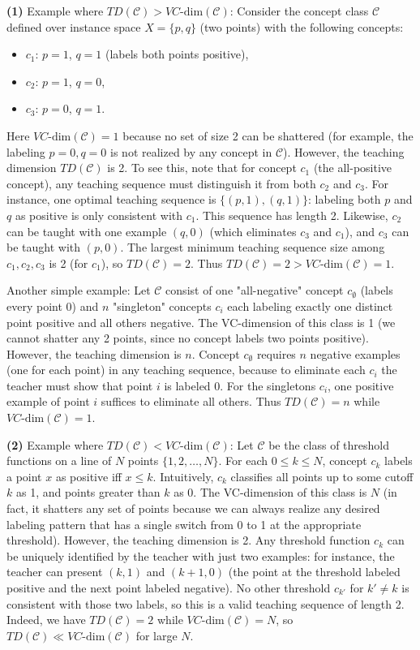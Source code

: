 \documentclass[11pt]{article}
\DeclareMathOperator{\1}{\mathbbm{1}}
\begin{document}
\textbf{(1)} Example where $TD(\mathcal{C}) > VC\text{-dim}(\mathcal{C})$: Consider the concept class $\mathcal{C}$ defined over instance space $X=\{p,q\}$ (two points) with the following concepts:
\begin{itemize}
  \item $c_1$: $p=1$, $q=1$ (labels both points positive),
  \item $c_2$: $p=1$, $q=0$,
  \item $c_3$: $p=0$, $q=1$.
\end{itemize}
Here $VC\text{-dim}(\mathcal{C}) = 1$ because no set of size 2 can be shattered (for example, the labeling $p=0,q=0$ is not realized by any concept in $\mathcal{C}$). However, the teaching dimension $TD(\mathcal{C})$ is 2. To see this, note that for concept $c_1$ (the all-positive concept), any teaching sequence must distinguish it from both $c_2$ and $c_3$. For instance, one optimal teaching sequence is $\{(p,1), (q,1)\}$: labeling both $p$ and $q$ as positive is only consistent with $c_1$. This sequence has length 2. Likewise, $c_2$ can be taught with one example $(q,0)$ (which eliminates $c_3$ and $c_1$), and $c_3$ can be taught with $(p,0)$. The largest minimum teaching sequence size among $c_1,c_2,c_3$ is 2 (for $c_1$), so $TD(\mathcal{C})=2$. Thus $TD(\mathcal{C})=2 > VC\text{-dim}(\mathcal{C})=1$.

Another simple example: Let $\mathcal{C}$ consist of one "all-negative" concept $c_{\emptyset}$ (labels every point 0) and $n$ "singleton" concepts $c_i$ each labeling exactly one distinct point positive and all others negative. The VC-dimension of this class is 1 (we cannot shatter any 2 points, since no concept labels two points positive). However, the teaching dimension is $n$. Concept $c_{\emptyset}$ requires $n$ negative examples (one for each point) in any teaching sequence, because to eliminate each $c_i$ the teacher must show that point $i$ is labeled 0. For the singletons $c_i$, one positive example of point $i$ suffices to eliminate all others. Thus $TD(\mathcal{C})=n$ while $VC\text{-dim}(\mathcal{C})=1$.

\textbf{(2)} Example where $TD(\mathcal{C}) < VC\text{-dim}(\mathcal{C})$: Let $\mathcal{C}$ be the class of threshold functions on a line of $N$ points $\{1,2,\dots,N\}$. For each $0 \le k \le N$, concept $c_k$ labels a point $x$ as positive iff $x \le k$. Intuitively, $c_k$ classifies all points up to some cutoff $k$ as 1, and points greater than $k$ as 0. The VC-dimension of this class is $N$ (in fact, it shatters any set of points because we can always realize any desired labeling pattern that has a single switch from 0 to 1 at the appropriate threshold). However, the teaching dimension is 2. Any threshold function $c_k$ can be uniquely identified by the teacher with just two examples: for instance, the teacher can present $(k,1)$ and $(k+1,0)$ (the point at the threshold labeled positive and the next point labeled negative). No other threshold $c_{k'}$ for $k' \neq k$ is consistent with those two labels, so this is a valid teaching sequence of length 2. Indeed, we have $TD(\mathcal{C})=2$ while $VC\text{-dim}(\mathcal{C})=N$, so $TD(\mathcal{C}) \ll VC\text{-dim}(\mathcal{C})$ for large $N$.
\end{document}
